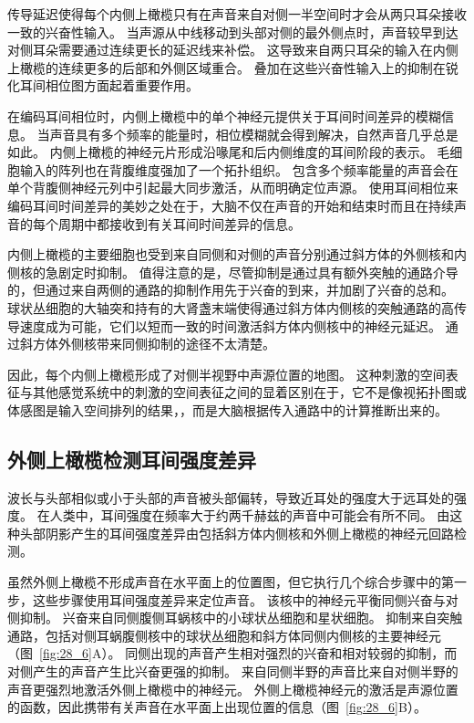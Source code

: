 传导延迟使得每个内侧上橄榄只有在声音来自对侧一半空间时才会从两只耳朵接收一致的兴奋性输入。
当声源从中线移动到头部对侧的最外侧点时，声音较早到达对侧耳朵需要通过连续更长的延迟线来补偿。
这导致来自两只耳朵的输入在内侧上橄榄的连续更多的后部和外侧区域重合。
叠加在这些兴奋性输入上的抑制在锐化耳间相位图方面起着重要作用。


在编码耳间相位时，内侧上橄榄中的单个神经元提供关于耳间时间差异的模糊信息。
当声音具有多个频率的能量时，相位模糊就会得到解决，自然声音几乎总是如此。
内侧上橄榄的神经元片形成沿喙尾和后内侧维度的耳间阶段的表示。
毛细胞输入的阵列也在背腹维度强加了一个拓扑组织。
包含多个频率能量的声音会在单个背腹侧神经元列中引起最大同步激活，从而明确定位声源。
使用耳间相位来编码耳间时间差异的美妙之处在于，大脑不仅在声音的开始和结束时而且在持续声音的每个周期中都接收到有关耳间时间差异的信息。


内侧上橄榄的主要细胞也受到来自同侧和对侧的声音分别通过斜方体的外侧核和内侧核的急剧定时抑制。
值得注意的是，尽管抑制是通过具有额外突触的通路介导的，但通过来自两侧的通路的抑制作用先于兴奋的到来，并加剧了兴奋的总和。
球状丛细胞的大轴突和持有的大肾盏末端使得通过斜方体内侧核的突触通路的高传导速度成为可能，它们以短而一致的时间激活斜方体内侧核中的神经元延迟。
通过斜方体外侧核带来同侧抑制的途径不太清楚。


因此，每个内侧上橄榄形成了对侧半视野中声源位置的地图。
这种刺激的空间表征与其他感觉系统中的刺激的空间表征之间的显着区别在于，它不是像视拓扑图或体感图是输入空间排列的结果，，而是大脑根据传入通路中的计算推断出来的。



\subsection{外侧上橄榄检测耳间强度差异}

波长与头部相似或小于头部的声音被头部偏转，导致近耳处的强度大于远耳处的强度。
在人类中，耳间强度在频率大于约两千赫兹的声音中可能会有所不同。
由这种头部阴影产生的耳间强度差异由包括斜方体内侧核和外侧上橄榄的神经元回路检测。


虽然外侧上橄榄不形成声音在水平面上的位置图，但它执行几个综合步骤中的第一步，这些步骤使用耳间强度差异来定位声音。
该核中的神经元平衡同侧兴奋与对侧抑制。
兴奋来自同侧腹侧耳蜗核中的小球状丛细胞和星状细胞。
抑制来自突触通路，包括对侧耳蜗腹侧核中的球状丛细胞和斜方体同侧内侧核的主要神经元（图~\ref{fig:28_6}A）。
同侧出现的声音产生相对强烈的兴奋和相对较弱的抑制，而对侧产生的声音产生比兴奋更强的抑制。
来自同侧半野的声音比来自对侧半野的声音更强烈地激活外侧上橄榄中的神经元。
外侧上橄榄神经元的激活是声源位置的函数，因此携带有关声音在水平面上出现位置的信息（图~\ref{fig:28_6}B）。


